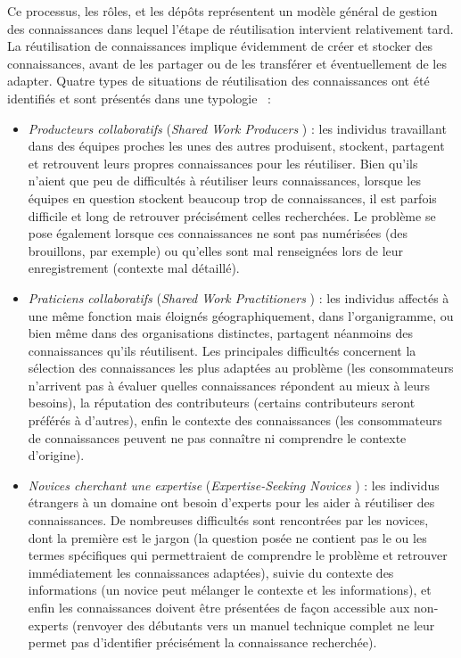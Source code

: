 \bigskip

Ce processus, les rôles, et les dépôts représentent un modèle général de gestion des connaissances dans lequel l'étape de réutilisation intervient relativement tard.
La réutilisation de connaissances implique évidemment de créer et stocker des connaissances, avant de les partager ou de les transférer et éventuellement de les adapter.
Quatre types de situations de réutilisation des connaissances ont été identifiés et sont présentés dans une typologie~\cite{markus2001toward} :

\begin{itemize}
\item \textit{Producteurs collaboratifs} (\og \textit{Shared Work Producers} \fg) : les individus travaillant dans des équipes proches les unes des autres produisent, stockent, partagent et retrouvent leurs propres connaissances pour les réutiliser.
Bien qu'ils n'aient que peu de difficultés à réutiliser leurs connaissances, lorsque les équipes en question stockent beaucoup trop de connaissances, il est parfois difficile et long de retrouver précisément celles recherchées.
Le problème se pose également lorsque ces connaissances ne sont pas numérisées (des brouillons, par exemple) ou qu'elles sont mal renseignées lors de leur enregistrement (contexte mal détaillé).\\

\item \textit{Praticiens collaboratifs} (\og \textit{Shared Work Practitioners} \fg) : les individus affectés à une même fonction mais éloignés géographiquement, dans l'organigramme, ou bien même dans des organisations distinctes, partagent néanmoins des connaissances qu'ils réutilisent.
Les principales difficultés concernent la sélection des connaissances les plus adaptées au problème (les consommateurs n'arrivent pas à évaluer quelles connaissances répondent au mieux à leurs besoins), la réputation des contributeurs (certains contributeurs seront préférés à d'autres), enfin le contexte des connaissances (les consommateurs de connaissances peuvent ne pas connaître ni comprendre le contexte d'origine).\\

\item \textit{Novices cherchant une expertise} (\og \textit{Expertise-Seeking Novices} \fg) : les individus étrangers à un domaine ont besoin d'experts pour les aider à réutiliser des connaissances.
De nombreuses difficultés sont rencontrées par les novices, dont la première est le jargon (la question posée ne contient pas le ou les termes spécifiques qui permettraient de comprendre le problème et retrouver immédiatement les connaissances adaptées), suivie du contexte des informations (un novice peut mélanger le contexte et les informations), et enfin les connaissances doivent être présentées de façon accessible aux non-experts (renvoyer des débutants vers un manuel technique complet ne leur permet pas d'identifier précisément la connaissance recherchée).\\


\end{itemize}
